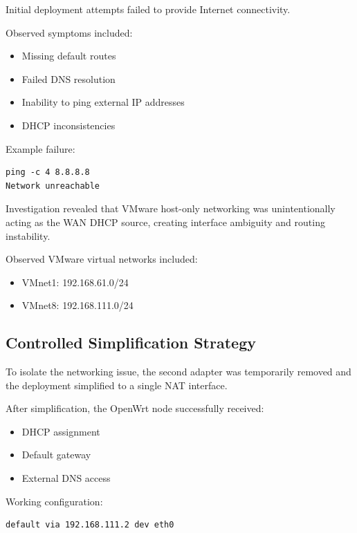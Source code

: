 \documentclass[conference]{IEEEtran}
\begin{document}
Initial deployment attempts failed to provide Internet connectivity.

Observed symptoms included:

\begin{itemize}
    \item Missing default routes
    \item Failed DNS resolution
    \item Inability to ping external IP addresses
    \item DHCP inconsistencies
\end{itemize}

Example failure:

\begin{lstlisting}
ping -c 4 8.8.8.8
Network unreachable
\end{lstlisting}

Investigation revealed that VMware host-only networking was unintentionally acting as the WAN DHCP source, creating interface ambiguity and routing instability.

Observed VMware virtual networks included:

\begin{itemize}
    \item VMnet1: 192.168.61.0/24
    \item VMnet8: 192.168.111.0/24
\end{itemize}

\subsection{Controlled Simplification Strategy}

To isolate the networking issue, the second adapter was temporarily removed and the deployment simplified to a single NAT interface.

After simplification, the OpenWrt node successfully received:

\begin{itemize}
    \item DHCP assignment
    \item Default gateway
    \item External DNS access
\end{itemize}

Working configuration:

\begin{lstlisting}
default via 192.168.111.2 dev eth0
\end{lstlisting}
\end{document}
